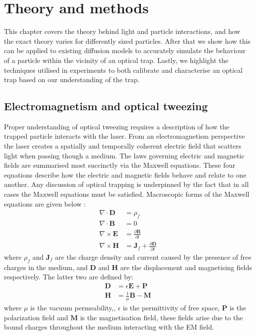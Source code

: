 \chapter{Theory and methods}
\label{chapter:theory}
This chapter covers the theory behind light and particle interactions, 
and how the exact theory varies for differently sized particles. After 
that we show how this can be applied to existing diffusion models to 
accurately simulate the behaviour of a particle within the vicinity of 
an optical trap. Lastly, we highlight the techniques utilised in 
experiments to both calibrate and characterise an optical trap based 
on our understanding of the trap. 

\section{Electromagnetism and optical tweezing}

Proper understanding of optical tweezing requires a description
of how the trapped particle interacts with the laser. From an
electromagnetism perspective the laser creates a spatially and 
temporally coherent electric field that scatters light when 
passing though a medium. The laws governing electric and magnetic 
fields are summarised most succinctly via the Maxwell equations. 
These four equations describe how the electric and magnetic fields 
behave and relate to one another. Any discussion of optical trapping 
is underpinned by the fact that in all cases the Maxwell equations 
must be satisfied. Macroscopic forms of the Maxwell equations are 
given below
\cite{Jackson_1975}:
\begin{align}
	\nabla \cdot \mathbf{D}
	&= \rho_f
	\\
	\nabla \cdot \mathbf{B}
	&= 0
	\\
	\nabla \times \mathbf{E}
	&= \frac{\partial \mathbf{B}}{\partial t}
	\\
	\nabla \times \mathbf{H}
	&= \mathbf{J}_f +\frac{\partial \mathbf{D}}{\partial t}  
\end{align}
where $\rho_f$ and $\mathbf{J}_f$ are the charge density and 
current caused by the presence of free charges in the medium, 
and $\mathbf{D}$ and $\mathbf{H}$ are the displacement and 
magnetising fields respectively. The latter two are defined by:
\begin{align}
	\mathbf{D} &= \epsilon\mathbf{E}+\mathbf{P} 
	\\ 
	\mathbf{H} &= \frac{1}{\mu}\mathbf{B}-\mathbf{M}
\end{align}
where $\mu$ is the vacuum permeability,, $\epsilon$ is the 
permittivity of free space, $\mathbf{P}$ is the polarization 
field and $\mathbf{M}$ is the magnetisation field, these 
fields arise due to the bound charges throughout the medium 
interacting with the EM field. 

